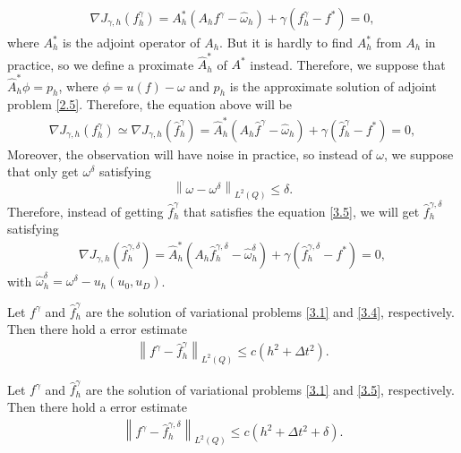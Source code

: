 \documentclass[notitlepage,a4paper,fleqn,9pt]{icmfarticle}
\begin{document}
\begin{multicols}{2}
\begin{align}\label{3.3}
\nabla J_{\gamma, h}(f^\gamma_h)= A_h^*(A_hf^\gamma-\hat{\omega}_h)+\gamma(f^\gamma_h-f^*)=0,
\end{align}
where $A_h^*$ is the adjoint operator of $A_h$. But it is hardly to find $A^*_h$ from $A_h$ in practice, so we define a proximate $\hat{A}_h^*$ of $A^*$ instead. Therefore, we suppose that $\hat{A}^*_h\phi=p_h$, where $\phi= u(f) - \omega$ and $p_h$ is the approximate solution of adjoint problem \eqref{2.5}. Therefore, the equation above will be
\begin{align}\label{3.4}
\nabla J_{\gamma, h}(f^\gamma_h)\simeq\nabla J_{\gamma, h}(\hat{f}^\gamma_h)= \hat{A}_h^*(A_h\hat{f}^\gamma-\hat{\omega}_h)+\gamma(\hat{f}^\gamma_h-f^*)=0,
\end{align}
Moreover, the observation will have noise in practice, so instead of $\omega$, we suppose that only get $\omega^{\delta}$ satisfying
$$\left\| \omega-\omega^\delta\right\|_{L^2(Q)}\leq \delta.$$
Therefore, instead of getting $\hat{f}^\gamma_h$ that satisfies the equation \eqref{3.5}, we will get $\hat{f}^{\gamma, \delta}_h$ satisfying
\begin{align}\label{3.5}
\nabla J_{\gamma, h}\left(\hat{f}^{\gamma, \delta}_h\right)= \hat{A}_h^*(A_h\hat{f}^{\gamma, \delta}_h-\hat{\omega}_h^\delta)+\gamma(\hat{f}^{\gamma, \delta}_h-f^*)=0,
\end{align}
with $\hat{\omega}_h^\delta=\omega^\delta- u_h(u_0, u_D)$.

\begin{dl}\label{dl3.3}
	Let $f^\gamma$ and $\hat{f}^\gamma_h$ are the solution of variational problems \eqref{3.1} and \eqref{3.4}, respectively. Then there hold a error estimate
	\begin{align}\label{3.11}
	\left\|f^\gamma-\hat{f}^\gamma_h \right\|_{L^2(Q)}\leq c(h^2+\Delta t^2).
	\end{align}
\end{dl}

\begin{cy}\label{cy3.1}
	Let $f^\gamma$ and $\hat{f}^\gamma_h$ are the solution of variational problems \eqref{3.1} and \eqref{3.5}, respectively. Then there hold a error estimate
	\begin{align}\label{3.12}
	\left\|f^\gamma-\hat{f}^{\gamma, \delta}_h \right\|_{L^2(Q)}\leq c(h^2+\Delta t^2+\delta).
	\end{align}
\end{cy}



\end{multicols}
\end{document}
